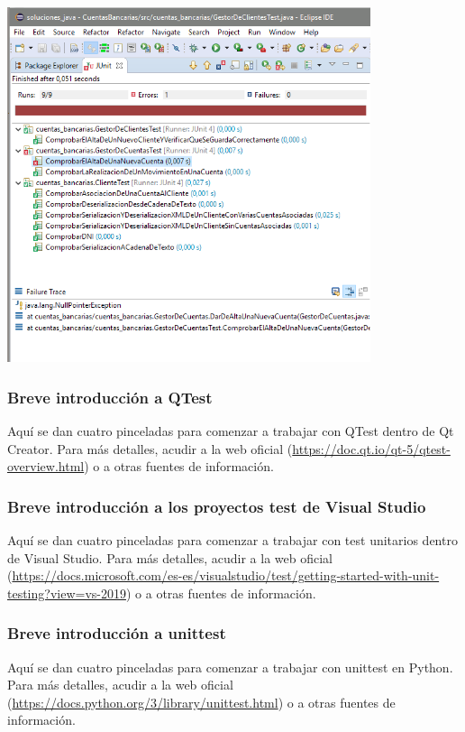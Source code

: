\documentclass[spanish,12pt,a4paper,final,oneside]{book}
\begin{document}
\includegraphics[width=0.8\textwidth]{JUnit4 - ejecucion de los test}



\subsubsection{Breve introducción a QTest}
Aquí se dan cuatro pinceladas para comenzar a trabajar con QTest dentro de Qt Creator. Para más detalles, acudir a la web oficial (\url{https://doc.qt.io/qt-5/qtest-overview.html}) o a otras fuentes de información.


\subsubsection{Breve introducción a los proyectos test de Visual Studio}
Aquí se dan cuatro pinceladas para comenzar a trabajar con test unitarios dentro de Visual Studio. Para más detalles, acudir a la web oficial (\url{https://docs.microsoft.com/es-es/visualstudio/test/getting-started-with-unit-testing?view=vs-2019}) o a otras fuentes de información.


\subsubsection{Breve introducción a unittest}
Aquí se dan cuatro pinceladas para comenzar a trabajar con unittest en Python. Para más detalles, acudir a la web oficial (\url{https://docs.python.org/3/library/unittest.html}) o a otras fuentes de información.
\end{document}
